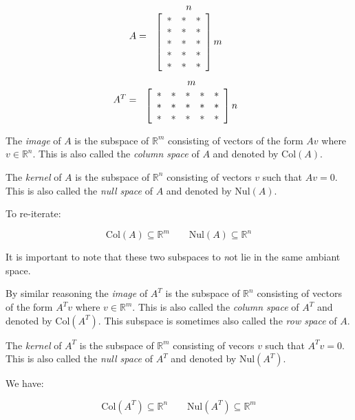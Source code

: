 \[ A =
\begin{array}{c@{\,}c@{\,}c}
  & n & \\
 &
\left[
\begin{array}{ccc}
 * & *  & *  \\
 * & *  & *  \\
  * & *  & *  \\
   * & *  & *  \\
    * & *  & *  
\end{array}
\right] m
\end{array}
\]
\[
 A^T =
\begin{array}{c@{\,}c@{\,}c}
  & m & \\
 &
\left[
\begin{array}{ccccc}
 *   &  * & * & * & * \\
*   &  * & * & * & * \\
*   &  * & * & * & * 
\end{array}
\right] n
\end{array}
\]

The \emph{image} of $A$ is the subspace of $\mathbb{R}^m$ consisting of vectors of the form $Av$ where $v \in \mathbb{R}^n$. This is also called the \emph{column space} of $A$ and denoted by $\mathrm{Col}(A)$.

The \emph{kernel} of $A$ is the subspace of $\mathbb{R}^n$ consisting of vectors $v$ such that $Av = 0$. This is also called the \emph{null space} of $A$ and denoted by $\mathrm{Nul}(A)$.

To re-iterate:

\[ \mathrm{Col}(A) \subseteq \mathbb{R}^m   \qquad
\mathrm{Nul}(A) \subseteq \mathbb{R}^n
\]

It is important to note that these two subspaces to {\emph not} lie in the same ambiant space. 

By similar reasoning the \emph{image} of $A^T$ is the subspace of $\mathbb{R}^n$ consisting of vectors of the form $A^Tv$ where $v \in \mathbb{R}^m$. This is also called the \emph{column space} of $A^T$ and denoted by $\mathrm{Col}(A^T)$. This subspace is sometimes also called the \emph{row space} of $A$.

The \emph{kernel} of $A^T$ is the subspace of $\mathbb{R}^m$ consisting of vecors $v$ such that $A^Tv = 0$. This is also called the \emph{null space} of $A^T$ and denoted by $\mathrm{Nul}(A^T)$. 

We have:

\[ \mathrm{Col}(A^T) \subseteq \mathbb{R}^n   \qquad
\mathrm{Nul}(A^T) \subseteq \mathbb{R}^m
\]


